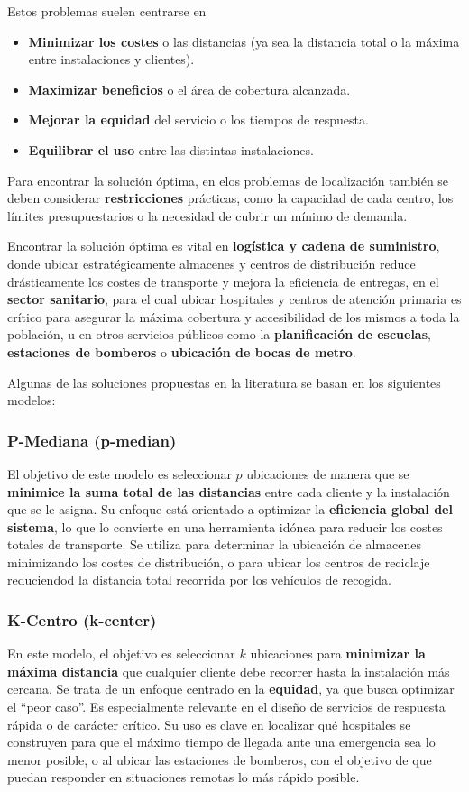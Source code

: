 \documentclass[12pt,a4paper]{book}
\begin{document}
Estos problemas suelen centrarse en
\begin{itemize}
    \item \textbf{Minimizar los costes} o las distancias (ya sea la distancia total o la máxima entre instalaciones y clientes).
    \item \textbf{Maximizar beneficios} o el área de cobertura alcanzada.
    \item \textbf{Mejorar la equidad} del servicio o los tiempos de respuesta.
    \item \textbf{Equilibrar el uso} entre las distintas instalaciones.
\end{itemize}

Para encontrar la solución óptima, en elos problemas de localización también se deben considerar \textbf{restricciones} prácticas, como la capacidad de cada centro, los límites presupuestarios o la necesidad de cubrir un mínimo de demanda.

Encontrar la solución óptima es vital en \textbf{logística y cadena de suministro}, donde ubicar estratégicamente almacenes y centros
de distribución reduce drásticamente los costes de transporte y mejora la eficiencia de entregas, en el \textbf{sector sanitario}, para el cual ubicar hospitales y centros de atención primaria es crítico para
asegurar la máxima cobertura y accesibilidad de los mismos a toda la población, u en otros servicios públicos como la \textbf{planificación de escuelas}, \textbf{estaciones de bomberos} o \textbf{ubicación de bocas de metro}.

Algunas de las soluciones propuestas en la literatura se basan en los siguientes modelos:

\subsubsection{P-Mediana (p-median)}
El objetivo de este modelo es seleccionar $p$ ubicaciones de manera que se \textbf{minimice la suma total de las distancias} entre cada cliente y la instalación que se le asigna. Su enfoque está orientado a optimizar la \textbf{eficiencia global del sistema}, lo que lo convierte en una herramienta idónea para reducir los costes totales de transporte.
Se utiliza para determinar la ubicación de almacenes minimizando los costes de distribución, o para ubicar los centros de reciclaje reduciendod la distancia total recorrida por los vehículos de recogida.

\subsubsection{K-Centro (k-center)}
En este modelo, el objetivo es seleccionar $k$ ubicaciones para \textbf{minimizar la máxima distancia} que cualquier cliente debe recorrer hasta la instalación más cercana. Se trata de un enfoque centrado en la \textbf{equidad}, ya que busca optimizar el ``peor caso''. Es especialmente relevante en el diseño de servicios de respuesta rápida o de carácter crítico.
Su uso es clave en localizar qué hospitales se construyen para que el máximo tiempo de llegada ante una emergencia sea lo menor posible, o al ubicar las estaciones de bomberos, con el objetivo de que puedan responder
en situaciones remotas lo más rápido posible.
\end{document}
